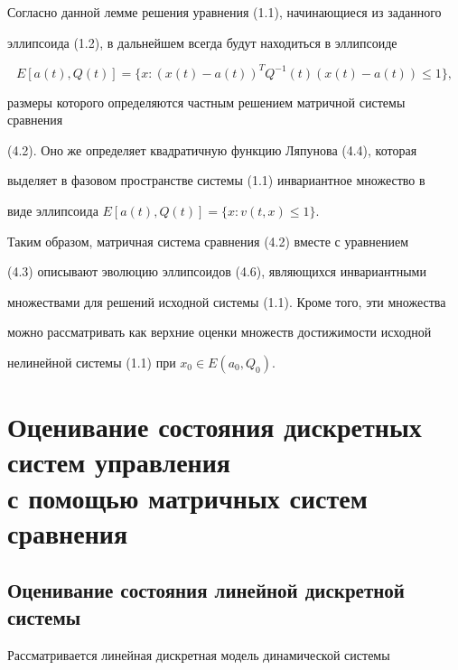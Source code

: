 Согласно данной лемме решения уравнения (1.1), начинающиеся из заданного


эллипсоида (1.2), в дальнейшем всегда будут находиться в эллипсоиде


\begin{equation}


E[a(t),Q(t)]=\{x:(x(t)-a(t))^T Q^{-1}(t)(x(t)-a(t))\le1\},


\end{equation}


размеры которого определяются частным решением матричной системы сравнения


(4.2). Оно же определяет квадратичную функцию Ляпунова (4.4), которая


выделяет в фазовом пространстве системы (1.1) инвариантное множество в


виде эллипсоида $E[a(t),Q(t)]=\{x:v(t,x)\le1\}$.





Таким образом, матричная система сравнения (4.2) вместе с уравнением


(4.3) описывают эволюцию эллипсоидов (4.6), являющихся инвариантными


множествами для решений исходной системы (1.1). Кроме того, эти множества


можно рассматривать как верхние оценки множеств достижимости исходной


нелинейной системы (1.1) при $x_0\in E(a_0,Q_0)$.








\section{Оценивание состояния дискретных систем управления\protect\\


с помощью матричных систем сравнения}





\subsection{Оценивание состояния линейной дискретной системы}





Рассматривается линейная дискретная модель динамической системы



